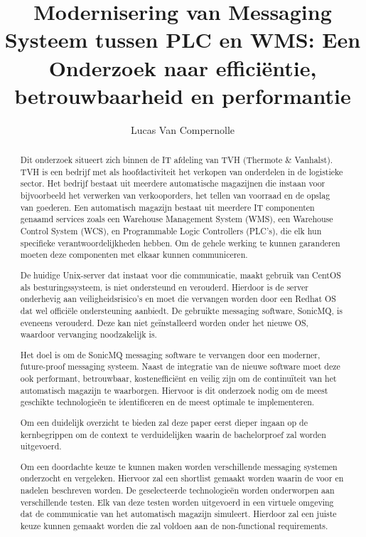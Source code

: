 \documentclass{hogent-article}
\title{Modernisering van Messaging Systeem tussen PLC en WMS: Een Onderzoek naar efficiëntie, betrouwbaarheid en performantie}
\author{Lucas Van Compernolle}
\begin{document}
\begin{abstract}

Dit onderzoek situeert zich binnen de IT afdeling van TVH (Thermote \& Vanhalst). 
TVH is een bedrijf met als hoofdactiviteit het verkopen van onderdelen in de logistieke sector.
Het bedrijf bestaat uit meerdere automatische magazijnen die instaan voor bijvoorbeeld het verwerken van verkooporders, 
het tellen van voorraad en de opslag van goederen. 
Een automatisch magazijn bestaat uit meerdere IT componenten genaamd services zoals
een Warehouse Management System (WMS), een Warehouse Control System (WCS), en Programmable Logic Controllers (PLC's), die elk hun specifieke verantwoordelijkheden hebben. 
Om de gehele werking te kunnen garanderen moeten deze componenten met elkaar kunnen communiceren. 
\newline

De huidige Unix-server dat instaat voor die communicatie, maakt gebruik van CentOS als besturingssysteem, is niet ondersteund en verouderd.
Hierdoor is de server onderhevig aan veiligheidsrisico's en moet die vervangen worden door een Redhat OS dat wel officiële ondersteuning aanbiedt.
De gebruikte messaging software, SonicMQ, is eveneens verouderd. 
Deze kan niet geïnstalleerd worden onder het nieuwe OS, waardoor vervanging noodzakelijk is. 
\newline

Het doel is om de SonicMQ messaging software te vervangen door een moderner, future-proof messaging systeem.
Naast de integratie van de nieuwe software moet deze ook performant, betrouwbaar, kostenefficiënt en veilig zijn 
om de continuïteit van het automatisch magazijn te waarborgen. 
Hiervoor is dit onderzoek nodig om de meest geschikte technologieën te identificeren en de meest optimale te implementeren.
\newline

Om een duidelijk overzicht te bieden zal deze paper eerst dieper ingaan op de kernbegrippen 
om de context te verduidelijken waarin de bachelorproef zal worden uitgevoerd.

Om een doordachte keuze te kunnen maken worden verschillende messaging systemen onderzocht en vergeleken. 
Hiervoor zal een shortlist gemaakt worden waarin de voor en nadelen beschreven worden.
De geselecteerde technologieën worden onderworpen aan verschillende testen.
Elk van deze testen worden uitgevoerd in een virtuele omgeving dat de communicatie van het automatisch magazijn simuleert. 
Hierdoor zal een juiste keuze kunnen gemaakt worden die zal voldoen aan de non-functional requirements.

\end{abstract}

\tableofcontents




\printbibliography[heading=bibintoc]
\end{document}
